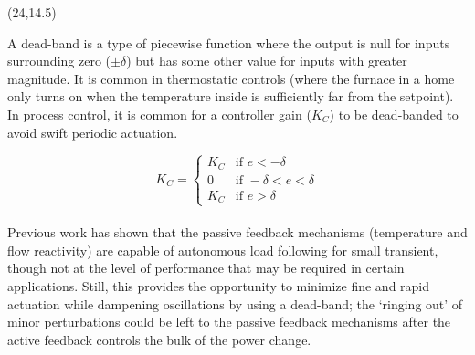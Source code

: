 \documentclass{article}
\def\CHead#1{\begin{center}\noindent{\LARGE\color{DarkBlue} #1}\end{center}}
\renewcommand{\LARGE}{\fontsize{43}{54}\selectfont}
\begin{document}
\begin{textblock}{10}(24,14.5)
\CHead{Dead-band}
A dead-band is a type of piecewise function where the output is null for inputs surrounding zero ($\pm \delta$) but has some other value for inputs with greater magnitude. It is common in thermostatic controls (where the furnace in a home only turns on when the temperature inside is sufficiently far from the setpoint). In process control, it is common for a controller gain ($K_C$) to be dead-banded to avoid swift periodic actuation.

\begin{equation*}
    K_C=
        \begin{cases}
            K_C & \text{if } e < -\delta \\
            0 & \text{if } -\delta < e < \delta \\
            K_C & \text{if } e > \delta 
        \end{cases}
\end{equation*}\\


    Previous work \cite{CarterPHD} has shown that the passive feedback mechanisms (temperature and flow reactivity) are capable of autonomous load following for small transient, though not at the level of performance that may be required in certain applications. Still, this provides the opportunity to minimize fine and rapid actuation while dampening oscillations by using a dead-band; the `ringing out' of minor perturbations could be left to the passive feedback mechanisms after the active feedback controls the bulk of the power change.


\end{textblock}

\end{document}
